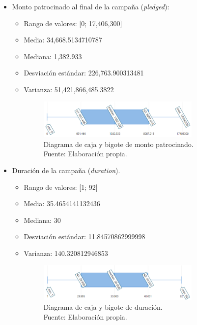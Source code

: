 \begin{itemize}
\begin{itemize}
\begin{figure}[!ht]
\begin{center}
{					Fuente: Elaboración propia.}
				\label{4:fig13}
			\end{center}
		\end{figure}
	\end{itemize}
	\item Monto patrocinado al final de la campaña (\textit{pledged}):
	\begin{itemize}
		\item Rango de valores: [0; 17,406,300]
		\item Media: 34,668.5134710787
		\item Mediana: 1,382.933
		\item Desviación estándar: 226,763.900313481
		\item Varianza: 51,421,866,485.3822
		\begin{figure}[!ht]
			\begin{center}
				\includegraphics[width=0.80\textwidth]{4/figures/caja_bigote_pledged.png}
				\caption[Diagrama de caja y bigote de monto patrocinado]{Diagrama de caja y bigote de monto patrocinado.\\
					Fuente: Elaboración propia.}
				\label{4:fig14}
			\end{center}
		\end{figure}
	\end{itemize}
	\item Duración de la campaña (\textit{duration}).
	\begin{itemize}
		\item Rango de valores: [1; 92]
		\item Media: 35.4654141132436
		\item Mediana: 30
		\item Desviación estándar: 11.84570862999998
		\item Varianza: 140.320812946853
		\begin{figure}[!ht]
			\begin{center}
				\includegraphics[width=0.80\textwidth]{4/figures/caja_bigote_duration.png}
				\caption[Diagrama de caja y bigote de duración]{Diagrama de caja y bigote de duración.\\
					Fuente: Elaboración propia.}
				\label{4:fig15}
			\end{center}
		\end{figure}
	\end{itemize}
\end{itemize}

